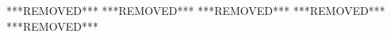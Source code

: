 \documentclass[10pt, journal, twocolumn]{IEEEtran}
\begin{document}
%
***REMOVED***
***REMOVED***
***REMOVED***
***REMOVED***
***REMOVED***
\end{document}
